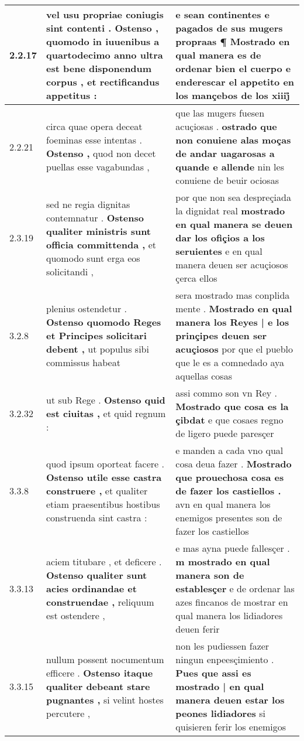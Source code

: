 \begin{tabular}{|p{1cm}|p{6.5cm}|p{6.5cm}|}
2.2.17 & vel usu propriae coniugis sint contenti . \textbf{ Ostenso , quomodo in iuuenibus a quartodecimo anno ultra est bene disponendum corpus , } et rectificandus appetitus : & e sean continentes e pagados de sus mugers propraas ¶ \textbf{ Mostrado en qual manera es de ordenar bien el cuerpo } e enderescar el appetito en los mançebos de los xiiij̊ \\\hline
2.2.21 & circa quae opera deceat foeminas esse intentas . \textbf{ Ostenso , } quod non decet puellas esse vagabundas , & que las mugers fuesen acuçiosas . \textbf{ ostrado que non conuiene alas moças de andar uagarosas a quande e allende } nin les conuiene de beuir ociosas \\\hline
2.3.19 & sed ne regia dignitas contemnatur . \textbf{ Ostenso qualiter ministris sunt officia committenda , } et quomodo sunt erga eos solicitandi , & por que non sea despreçiada la dignidat real \textbf{ mostrado en qual manera se deuen dar los ofiçios a los seruientes } e en qual manera deuen ser acuçiosos çerca ellos \\\hline
3.2.8 & plenius ostendetur . \textbf{ Ostenso quomodo Reges et Principes solicitari debent , } ut populus sibi commissus habeat & sera mostrado mas conplida mente . \textbf{ Mostrado en qual manera los Reyes | e los prinçipes deuen ser acuçiosos } por que el pueblo que le es a comnedado aya aquellas cosas \\\hline
3.2.32 & ut sub Rege . \textbf{ Ostenso quid est ciuitas , } et quid regnum : & assi commo son vn Rey . \textbf{ Mostrado que cosa es la çibdat } e que cosaes regno de ligero puede paresçer \\\hline
3.3.8 & quod ipsum oporteat facere . \textbf{ Ostenso utile esse castra construere , } et qualiter etiam praesentibus hostibus construenda sint castra : & e manden a cada vno qual cosa deua fazer . \textbf{ Mostrado que prouechosa cosa es de fazer los castiellos . } avn en qual manera los enemigos presentes son de fazer los castiellos \\\hline
3.3.13 & aciem titubare , et deficere . \textbf{ Ostenso qualiter sunt acies ordinandae et construendae , } reliquum est ostendere , & e mas ayna puede fallesçer . \textbf{ m mostrado en qual manera son de establesçer } e de ordenar las azes fincanos de mostrar en qual manera los lidiadores deuen ferir \\\hline
3.3.15 & nullum possent nocumentum efficere . \textbf{ Ostenso itaque qualiter debeant stare pugnantes , } si velint hostes percutere , & non les pudiessen fazer ningun enpeesçimiento . \textbf{ Pues que assi es mostrado | en qual manera deuen estar los peones lidiadores } si quisieren ferir los enemigos \\\hline

\end{tabular}
